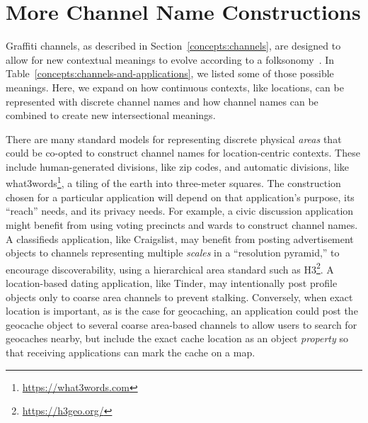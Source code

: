 \section{More Channel Name Constructions}
\label{appendix:more-channel-names}

Graffiti channels, as described in
Section~\ref{concepts:channels},
are designed to allow for new contextual meanings to evolve according to a folksonomy~\cite{folksonomy}.
In Table~\ref{concepts:channels-and-applications},
we listed some of those possible meanings.
Here, we expand on how continuous
contexts, like locations, can be represented with
discrete channel names and how channel names
can be combined to create new
intersectional meanings.


There are many standard models for representing
discrete physical \emph{areas} that could be co-opted to construct channel
names for location-centric contexts. These include
human-generated divisions, like zip codes,
and automatic divisions, like what3words\footnote{
    \url{https://what3words.com}
}, a tiling of the earth into three-meter squares.
The construction chosen for a particular application will
depend on that application's purpose,
its ``reach'' needs, and its privacy needs.
For example, a civic discussion application
might benefit from using voting precincts and wards
to construct channel names.
A classifieds application, like Craigslist, may benefit from posting
advertisement objects to channels representing multiple \emph{scales}
in a ``resolution pyramid,'' to encourage discoverability,
using a hierarchical area standard such as H3\footnote{
    \url{https://h3geo.org/}
}.
A location-based dating application, like Tinder, may intentionally
post profile objects only to coarse area channels to prevent stalking.
Conversely, when exact location is important,
as is the case for geocaching, an application could post the geocache
object to several coarse area-based channels to allow users
to search for geocaches nearby, but include
the exact cache location as an object \emph{property}
so that receiving applications can mark the cache on a map.

